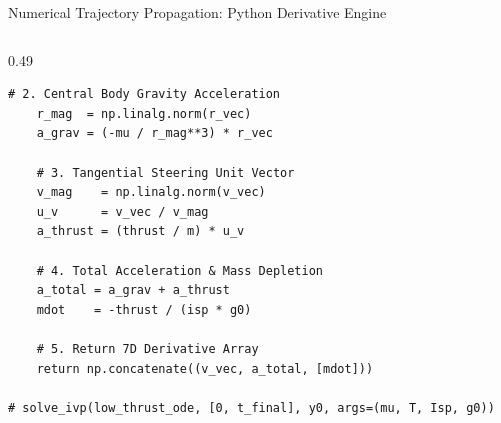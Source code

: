 \documentclass[aspectratio=169, 10pt]{beamer}
\begin{document}
\begin{frame}[fragile]{Numerical Trajectory Propagation: Python Derivative Engine}
\begin{columns}[T]
\begin{column}{0.49\textwidth}
\begin{lstlisting}[style=pythoncode]
    # 2. Central Body Gravity Acceleration
    r_mag  = np.linalg.norm(r_vec)
    a_grav = (-mu / r_mag**3) * r_vec
    
    # 3. Tangential Steering Unit Vector
    v_mag    = np.linalg.norm(v_vec)
    u_v      = v_vec / v_mag
    a_thrust = (thrust / m) * u_v
    
    # 4. Total Acceleration & Mass Depletion
    a_total = a_grav + a_thrust
    mdot    = -thrust / (isp * g0)
    
    # 5. Return 7D Derivative Array
    return np.concatenate((v_vec, a_total, [mdot]))

# solve_ivp(low_thrust_ode, [0, t_final], y0, args=(mu, T, Isp, g0))
\end{lstlisting}
        \end{column}
    \end{columns}
\end{frame}
\end{document}
